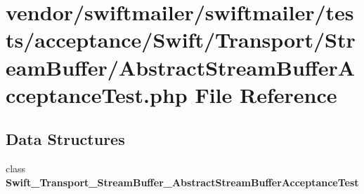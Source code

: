 \section{vendor/swiftmailer/swiftmailer/tests/acceptance/\+Swift/\+Transport/\+Stream\+Buffer/\+Abstract\+Stream\+Buffer\+Acceptance\+Test.php File Reference}
\label{_abstract_stream_buffer_acceptance_test_8php}
\subsection*{Data Structures}
\begin{DoxyCompactItemize}
\item 
class {\bf Swift\+\_\+\+Transport\+\_\+\+Stream\+Buffer\+\_\+\+Abstract\+Stream\+Buffer\+Acceptance\+Test}
\end{DoxyCompactItemize}

